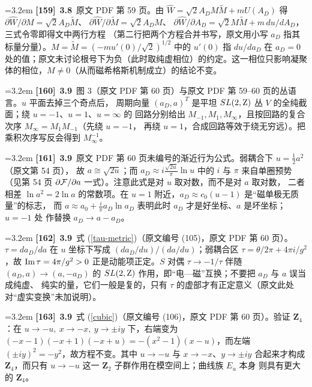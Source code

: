 \par
\par\medskip\noindent\hangindent=3.2em \textbf{[159]}~\textbf{3.8}~原文 PDF 第 59 页。由 $\hat W=\sqrt2 A_DM\widetilde M+mU(A_D)$ 得  $\partial\hat W/\partial M=\sqrt2 A_D\widetilde M$、  $\partial\hat W/\partial\widetilde M=\sqrt2 A_DM$、  $\partial\hat W/\partial A_D=\sqrt2 M\widetilde M+m\,du/dA_D$，三式令零即得文中两行方程  （第二行把两个方程合并书写，原文用小写 $a_D$ 指其标量分量）。$M=\widetilde M=(-m u'(0)/\sqrt2)^{1/2}$  中的 $u'(0)$ 指 $du/da_D$ 在 $a_D=0$ 处的值；原文未讨论根号下为负（此时取纯虚相位）的约定。这一相位只影响凝聚体的相位，$M\ne0$（从而磁希格斯机制成立）的结论不变。
\par
\par\medskip\noindent\hangindent=3.2em \textbf{[160]}~\textbf{3.9}~图 3（原文 PDF 第 60 页）与原文 PDF 第 59--60 页的丛语言。$u$ 平面去掉三个奇点后，  周期向量 $(a_D,a)^T$ 是平坦 $SL(2,{\rm Z})$ 丛 $V$ 的全纯截面；绕 $u=-1$、$u=1$、$u=\infty$ 的  回路分别给出 $M_{-1},M_1,M_\infty$，且按回路的复合次序 $M_\infty=M_1M_{-1}$（先绕 $u=-1$，  再绕 $u=1$，合成回路等效于绕无穷远）。把乘积次序写反会得到 $M_\infty^{-1}$。
\par
\par\medskip\noindent\hangindent=3.2em \textbf{[161]}~\textbf{3.9}~原文 PDF 第 60 页未编号的渐近行为公式。弱耦合下 $u=\frac12a^2$（原文第 54 页），  故 $a\cong\sqrt{2u}$；而 $a_D\approx i\frac{\sqrt{2u}}{\pi}\ln u$ 中的 $i$ 与 $\pi$ 来自单圈预势  （见第 54 页 $\partial{\cal F}/\partial a$ 一式）。注意此式是对 $u$ 取对数，而不是对 $a$ 取对数，  二者相差 $\ln a^2=2\ln a$ 的常数项。在 $u=1$ 附近，$a_D\approx c_0(u-1)$ 是“磁单极无质量”的标志，  而 $a\approx a_0+\frac{i}{\pi}a_D\ln a_D$ 表明此时 $a_D$ 才是好坐标、$a$ 是坏坐标；$u=-1$ 处  作替换 $a_D\to a-a_D$。
\par
\par\medskip\noindent\hangindent=3.2em \textbf{[162]}~\textbf{3.9}~式 (\ref{tau-metric})（原文编号 (105)，原文 PDF 第 60 页）。$\tau=da_D/da$ 在 $u$  坐标下写成 $(da_D/du)/(da/du)$；弱耦合区 $\tau=\theta/2\pi+4\pi i/g^2$，故  ${\rm Im}\,\tau=4\pi/g^2>0$ 正是动能项正定。$S$ 对偶 $\tau\to-1/\tau$ 伴随  $(a_D,a)\to(a,-a_D)$ 的 $SL(2,{\rm Z})$ 作用，即“电—磁”互换；不要把 $a_D$ 与 $a$ 误当成纯虚、  纯实的量，它们一般是复的，只有 $\tau$ 的虚部才有正定意义（原文此处对“虚实变换”未加说明）。
\par
\par\medskip\noindent\hangindent=3.2em \textbf{[163]}~\textbf{3.9}~式 (\ref{cubic})（原文编号 (106)，原文 PDF 第 60 页）。验证 $\mathbf{Z}_4$：在  $u\to-u,\ x\to-x,\ y\to\pm iy$ 下，右端变为 $(-x-1)(-x+1)(-x+u)=-(x^2-1)(x-u)$，而左端  $(\pm iy)^2=-y^2$，故方程不变。其中 $u\to-u$ 与 $x\to-x$、$y\to\pm iy$ 合起来才构成  $\mathbf{Z}_4$，而只有 $u\to-u$ 这一 $\mathbf{Z}_2$ 子群作用在模空间上；曲线族 $E_u$ 本身  则具有更大的 $\mathbf{Z}_4$。
